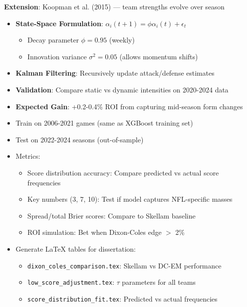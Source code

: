 \textbf{Extension}: Koopman et al. (2015) — team strengths evolve over season

\begin{itemize}
  \item {} \textbf{State-Space Formulation}: $\alpha_i(t+1) = \phi \alpha_i(t) + \epsilon_t$
  \begin{itemize}
    \item Decay parameter $\phi = 0.95$ (weekly)
    \item Innovation variance $\sigma^2 = 0.05$ (allows momentum shifts)
  \end{itemize}
  \item {} \textbf{Kalman Filtering}: Recursively update attack/defense estimates
  \item {} \textbf{Validation}: Compare static vs dynamic intensities on 2020-2024 data
  \item \textbf{Expected Gain}: +0.2-0.4\% ROI from capturing mid-season form changes
\end{itemize}

\begin{itemize}
  \item {} Train on 2006-2021 games (same as XGBoost training set)
  \item {} Test on 2022-2024 seasons (out-of-sample)
  \item {} Metrics:
  \begin{itemize}
    \item Score distribution accuracy: Compare predicted vs actual score frequencies
    \item Key numbers (3, 7, 10): Test if model captures NFL-specific masses
    \item Spread/total Brier scores: Compare to Skellam baseline
    \item ROI simulation: Bet when Dixon-Coles edge $>$ 2\%
  \end{itemize}
  \item {} Generate LaTeX tables for dissertation:
  \begin{itemize}
    \item \texttt{dixon\_coles\_comparison.tex}: Skellam vs DC-EM performance
    \item \texttt{low\_score\_adjustment.tex}: $\tau$ parameters for all teams
    \item \texttt{score\_distribution\_fit.tex}: Predicted vs actual frequencies
  \end{itemize}
\end{itemize}

